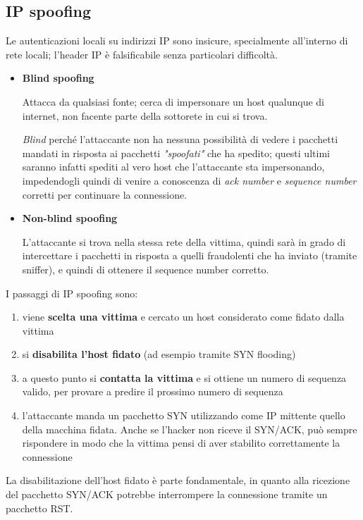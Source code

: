 \subsection{IP spoofing}
Le autenticazioni locali su indirizzi IP sono insicure, specialmente 
all'interno di rete locali; l'header IP è falsificabile senza particolari 
difficoltà.
\begin{itemize}
    \item \textbf{Blind spoofing}
    
    \noindent Attacca da qualsiasi fonte; cerca di impersonare un host qualunque
    di internet, non facente parte della sottorete in cui si trova.
    
    \noindent \textit{Blind} perché l'attaccante non ha nessuna possibilità di vedere i 
    pacchetti mandati in risposta ai pacchetti \textit{"spoofati"} che ha spedito;
    questi ultimi saranno infatti spediti al vero host che l'attaccante sta impersonando, 
    impedendogli quindi di venire a conoscenza di \textit{ack number} e \textit{sequence number}
    corretti per continuare la connessione.

    \item \textbf{Non-blind spoofing}
    
    \noindent L'attaccante si trova nella stessa rete della vittima, quindi sarà in grado 
    di intercettare i pacchetti in risposta a quelli fraudolenti che ha inviato (tramite sniffer), e quindi 
    di ottenere il sequence number corretto.
\end{itemize}

\noindent I passaggi di IP spoofing sono:
\begin{enumerate}
    \item viene \textbf{scelta una vittima} e cercato un host considerato come fidato dalla vittima 
    \item si \textbf{disabilita l'host fidato} (ad esempio tramite SYN flooding)
    \item a questo punto si \textbf{contatta la vittima} e si ottiene un numero di sequenza valido, per provare 
    a predire il prossimo numero di sequenza 
    \item l'attaccante manda un pacchetto SYN utilizzando come IP mittente quello della macchina fidata. Anche se 
    l'hacker non riceve il SYN/ACK, può sempre rispondere in modo che la vittima pensi di aver stabilito correttamente la 
    connessione 
\end{enumerate}

\noindent La disabilitazione dell'host fidato è parte fondamentale, in quanto alla ricezione 
del pacchetto SYN/ACK potrebbe interrompere la connessione tramite un pacchetto RST.


